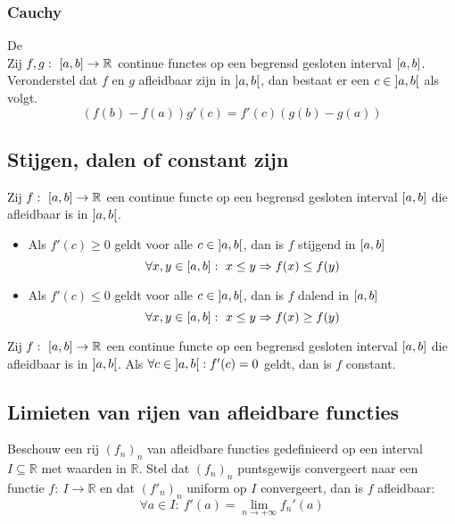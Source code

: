 \documentclass[main.tex]{subfiles}
\begin{document}
\subsubsection{Cauchy}
\label{sec:cauchy}

\begin{st}
  De \\
  Zij $f,g:\ \interval{a}{b} \rightarrow \mathbb{R}$ continue functes op een begrensd gesloten interval $\interval{a}{b}$.
  Veronderstel dat $f$ en $g$ afleidbaar zijn in $\interval[open]{a}{b}$, dan bestaat er een $c\in \interval[open]{a}{b}$ als volgt.
  \[ \left( f(b) - f(a) \right) g'(c) = f'(c) \left( g(b) - g(a) \right) \]
\end{st}

\subsection{Stijgen, dalen of constant zijn}

\begin{pr}
  Zij $f:\ \interval{a}{b} \rightarrow \mathbb{R}$ een continue functe op een begrensd gesloten interval $\interval{a}{b}$ die afleidbaar is in $\interval[open]{a}{b}$.
  \begin{itemize}
  \item Als $f'(c) \ge 0$ geldt voor alle $c \in \interval[open]{a}{b}$, dan is $f$ stijgend in $\interval{a}{b}$
    \[ \forall x,y \in \interval{a}{b}:\ x \le y \Rightarrow f(x) \le f(y) \]
  \item Als $f'(c) \le 0$ geldt voor alle $c \in \interval[open]{a}{b}$, dan is $f$ dalend in $\interval{a}{b}$
    \[ \forall x,y \in \interval{a}{b}:\ x \le y \Rightarrow f(x) \ge f(y) \]
  \end{itemize}
\end{pr}

\begin{pr}
  Zij $f:\ \interval{a}{b} \rightarrow \mathbb{R}$ een continue functe op een begrensd gesloten interval $\interval{a}{b}$ die afleidbaar is in $\interval[open]{a}{b}$.
  Als $\forall c\in \interval[open]{a}{b}: f'(c) = 0$ geldt, dan is $f$ constant.
\end{pr}

\subsection{Limieten van rijen van afleidbare functies}
\label{sec:limieten-van-rijen}

\begin{st}
  Beschouw een rij $(f_{n})_{n}$ van afleidbare functies gedefinieerd op een interval $I \subseteq \mathbb{R}$ met waarden in $\mathbb{R}$.
  Stel dat $(f_{n})_{n}$ puntsgewijs convergeert naar een functie $f:\ I \rightarrow \mathbb{R}$ en dat $(f'_{n})_{n}$ uniform op $I$ convergeert, dan is $f$ afleidbaar:
  \[ \forall a\in I:\ f'(a) = \lim_{n\rightarrow +\infty}f_{n}'(a) \]
\end{st}
\end{document}
